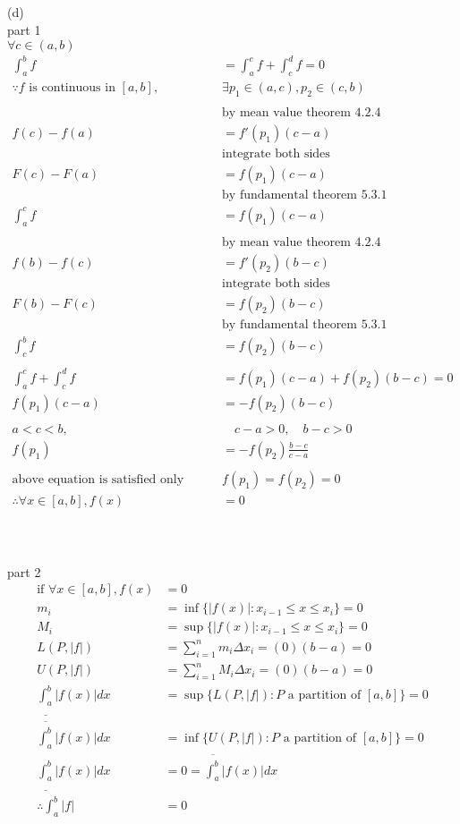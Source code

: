 \documentclass[12pt, border = 4pt, multi]{article} %
\begin{document}
\\
\\
\\
\\
(d)\\
part 1\\
$\forall c \in (a, b)$
\begin{align*}
\int_a ^ b f &= \int_a ^ c f + \int_c ^ d f = 0\\
\because f \text{ is continuous in } [a, b], &\exists p_1 \in (a, c), p_2 \in (c, b)\\
\\
&\text{by mean value theorem 4.2.4}\\
f(c) - f(a) &= f'(p_1)(c - a)\\
&\text{integrate both sides}\\
F(c) - F(a) &= f(p_1)(c - a)\\
&\text{by fundamental theorem 5.3.1}\\
\int_a ^ c f &= f(p_1)(c - a)\\
\\
&\text{by mean value theorem 4.2.4}\\
f(b) - f(c) &= f'(p_2)(b - c)\\
&\text{integrate both sides}\\
F(b) - F(c) &= f(p_2)(b - c)\\
&\text{by fundamental theorem 5.3.1}\\
\int_c ^ b f &= f(p_2)(b - c)\\
\\
\int_a ^ c f + \int_c ^ d f &= f(p_1)(c - a) + f(p_2)(b - c) = 0\\
f(p_1)(c - a) &= -f(p_2)(b - c)\\
\\
a < c < b, &\quad c - a > 0, \quad b - c > 0\\
f(p_1) &= -f(p_2)\frac{b - c}{c - a}\\
\\
\text{above equation is satisfied only when} &f(p_1) = f(p_2) = 0\\
\therefore \forall x \in [a, b], f(x) &= 0
\end{align*}
\\
\\
\\
part 2
\begin{align*}
\text{if } \forall x \in [a, b], f(x) &= 0\\
m_i &= \inf\{|f(x)|: x_{i - 1} \leq x \leq x_i\} = 0\\
M_i &= \sup\{|f(x)|: x_{i - 1} \leq x \leq x_i\} = 0\\
L(P, |f|) &= \sum_{i = 1} ^ n m_i \Delta x_i = (0)(b - a) = 0\\
U(P, |f|) &= \sum_{i = 1} ^ n M_i \Delta x_i = (0)(b - a) = 0\\
\underline{\int_a ^ b}|f(x)|dx &= \sup\{L(P, |f|): P \text{ a partition of }[a, b]\} = 0\\
\overline{\int_a ^ b}|f(x)|dx &= \inf\{U(P, |f|): P \text{ a partition of }[a, b]\} = 0\\
\underline{\int_a ^ b}|f(x)|dx &= 0 = \overline{\int_a ^ b}|f(x)|dx\\
\therefore \int_a ^ b|f| &= 0
\end{align*}
\end{document}
